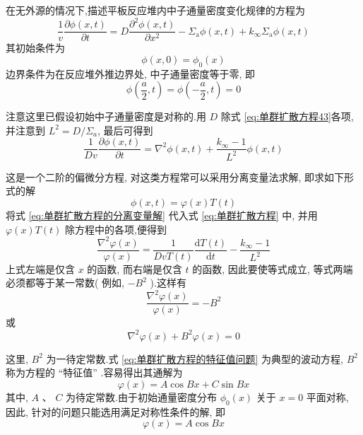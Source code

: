 \documentclass{Sichuan Normal University}
\begin{document}
在无外源的情况下,描述平板反应堆内中子通量密度变化规律的方程为
\begin{equation}
\frac{1}{v} \frac{\partial \phi(x, t)}{\partial t}=D \frac{\partial^2 \phi(x, t)}{\partial x^2}-\Sigma_{\mathrm{a}} \phi(x, t)+k_{\infty} \Sigma_{\mathrm{a}} \phi(x, t)
\label{eq:单群扩散方程43}
\end{equation}
其初始条件为
\begin{equation}
\phi(x, 0)=\phi_0(x)
\label{eq:初始条件44}
\end{equation}
边界条件为在反应堆外推边界处, 中子通量密度等于零, 即
\begin{equation}
\phi\left(\frac{a}{2}, t\right)=\phi\left(-\frac{a}{2}, t\right)=0
\label{eq:边界条件}
\end{equation}

注意这里已假设初始中子通量密度是对称的.用 $D$ 除式 \eqref{eq:单群扩散方程43}各项, 并注意到 $L^2=D / \Sigma_a$, 最后可得到
\begin{equation}
\frac{1}{D v} \frac{\partial \phi(x, t)}{\partial t}=\nabla^2 \phi(x, t)+\frac{k_{\infty}-1}{L^2} \phi(x, t)
\label{eq:单群扩散方程}
\end{equation}

这是一个二阶的偏微分方程, 对这类方程常可以采用分离变量法求解, 即求如下形式的解
\begin{equation}
\phi(x, t)=\varphi(x) T(t)
\label{eq:单群扩散方程的分离变量解}
\end{equation}
将式 \eqref{eq:单群扩散方程的分离变量解} 代入式 \eqref{eq:单群扩散方程} 中, 并用 $\varphi(x) T(t)$ 除方程中的各项,便得到
\begin{equation}
\frac{\nabla^2 \varphi(x)}{\varphi(x)}=\frac{1}{{Dv} T(t)} \frac{\mathrm{d} T(t)}{\mathrm{d} t}-\frac{k_{\infty}-1}{L^2}
\label{eq:单群扩散方程的分离变量解48}
\end{equation}
上式左端是仅含 $x$ 的函数, 而右端是仅含 $t$ 的函数, 因此要使等式成立, 等式两端必须都等于某一常数( 例如, $-B^2$ ).这样有
\begin{equation}
\frac{\nabla^2 \varphi(x)}{\varphi(x)}=-B^2
\end{equation}
或
\begin{equation}
\nabla^2 \varphi(x)+B^2 \varphi(x)=0
\label{eq:单群扩散方程的特征值问题}
\end{equation}

这里, $B^2$ 为一待定常数.式 \eqref{eq:单群扩散方程的特征值问题} 为典型的波动方程, $B^2$ 称为方程的 “特征值” .容易得出其通解为
\begin{equation}
\varphi(x)=A \cos B x+C \sin B x
\end{equation}
其中, $A$ 、 $C$ 为待定常数.由于初始通量密度分布 $\phi_0(x)$ 关于 $x=0$ 平面对称, 因此, 针对的问题只能选用满足对称性条件的解, 即
\begin{equation}
\varphi(x)=A \cos B x
\end{equation}
\end{document}
